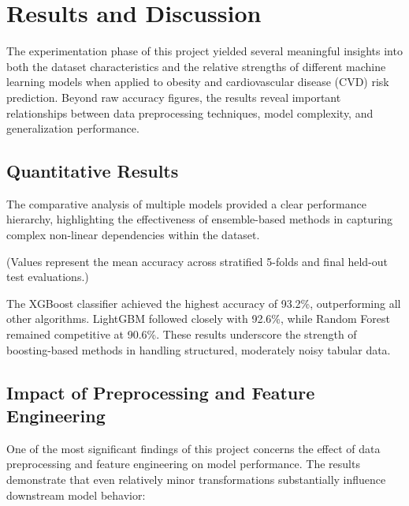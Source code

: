 \chapter{Results and Discussion}\label{ch:results}
The experimentation phase of this project yielded several meaningful insights into both the dataset characteristics and the relative strengths of different machine learning models when applied to obesity and cardiovascular disease (CVD) risk prediction.
Beyond raw accuracy figures, the results reveal important relationships between data preprocessing techniques, model complexity, and generalization performance.


\section{Quantitative Results}\label{sec:quantitative-results}

The comparative analysis of multiple models provided a clear performance hierarchy, highlighting the effectiveness of ensemble-based methods in capturing complex non-linear dependencies within the dataset.


(Values represent the mean accuracy across stratified 5-folds and final held-out test evaluations.)

The XGBoost classifier achieved the highest accuracy of 93.2\%, outperforming all other algorithms.
LightGBM followed closely with 92.6\%, while Random Forest remained competitive at 90.6\%.
These results underscore the strength of boosting-based methods in handling structured, moderately noisy tabular data.



\section{Impact of Preprocessing and Feature Engineering}\label{sec:impact-of-preprocessing-and-feature-engineering}

One of the most significant findings of this project concerns the effect of data preprocessing and feature engineering on model performance.
The results demonstrate that even relatively minor transformations substantially influence downstream model behavior:

